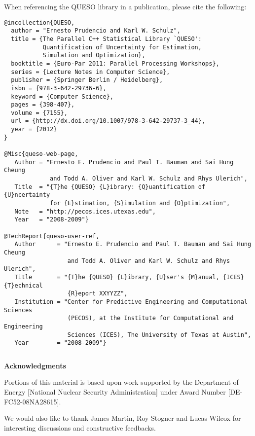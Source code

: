 When referencing the QUESO library in a publication, please cite the following:
\begin{verbatim}
@incollection{QUESO,
  author = "Ernesto Prudencio and Karl W. Schulz",
  title = {The Parallel C++ Statistical Library `QUESO':
           Quantification of Uncertainty for Estimation,
           Simulation and Optimization},
  booktitle = {Euro-Par 2011: Parallel Processing Workshops},
  series = {Lecture Notes in Computer Science},
  publisher = {Springer Berlin / Heidelberg},
  isbn = {978-3-642-29736-6},
  keyword = {Computer Science},
  pages = {398-407},
  volume = {7155},
  url = {http://dx.doi.org/10.1007/978-3-642-29737-3_44},
  year = {2012}
}

@Misc{queso-web-page,
   Author = "Ernesto E. Prudencio and Paul T. Bauman and Sai Hung Cheung
             and Todd A. Oliver and Karl W. Schulz and Rhys Ulerich",
   Title  = "{T}he {QUESO} {L}ibrary: {Q}uantification of {U}ncertainty
             for {E}stimation, {S}imulation and {O}ptimization",
   Note   = "http://pecos.ices.utexas.edu",
   Year   = "2008-2009"}

@TechReport{queso-user-ref,
   Author      = "Ernesto E. Prudencio and Paul T. Bauman and Sai Hung Cheung
                  and Todd A. Oliver and Karl W. Schulz and Rhys Ulerich",
   Title       = "{T}he {QUESO} {L}ibrary, {U}ser's {M}anual, {ICES} {T}echnical
                  {R}eport XXYYZZ",
   Institution = "Center for Predictive Engineering and Computational Sciences
                  (PECOS), at the Institute for Computational and Engineering
                  Sciences (ICES), The University of Texas at Austin",
   Year        = "2008-2009"}
\end{verbatim}
$~$\\
$~$\\

\centerline{\bf Acknowledgments}

Portions of this material is based upon work supported by the Department of Energy [National Nuclear Security Administration] under Award Number [DE-FC52-08NA28615].

We would also like to thank
James Martin,
Roy Stogner and
Lucas Wilcox
for interesting discussions and constructive feedbacks.

